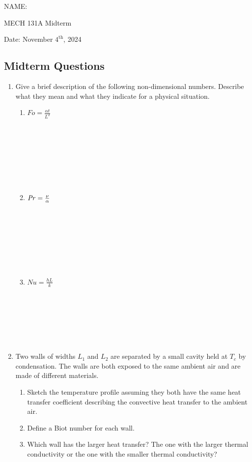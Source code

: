 \documentclass[12pt,letterpaper]{article}
\begin{document}
\noindent
NAME:

\noindent
MECH 131A Midterm

\noindent
Date: November $4^{\mathrm{th}}$, 2024

\subsection*{Midterm Questions}

\begin{enumerate}

    \item Give a brief description of the following non-dimensional numbers.
        Describe what they mean and what they indicate for a physical situation.

    \begin{enumerate}
        \item $\mathit{Fo} = \frac{\alpha t}{L^2}$ \\ \\ \\ \\ \\ \\ \\ \\
        \item $\mathit{Pr} = \frac{\nu}{\alpha}$ \\ \\ \\ \\ \\ \\ \\ \\
        \item $\mathit{Nu} = \frac{h L}{k}$ \\ \\ \\ \\ \\ \\ \\
    \end{enumerate}
    \newpage

    \item Two walls of widths $L_1$ and $L_2$ are separated by a small cavity held at $T_c$ by condensation.
        The walls are both exposed to the same ambient air and are made of different materials.
        \begin{enumerate}
            \item Sketch the temperature profile assuming they both have the same heat transfer coefficient describing the convective heat transfer to the ambient air.
            \item Define a Biot number for each wall.
            \item Which wall has the larger heat transfer?
                The one with the larger thermal conductivity or the one with the smaller thermal conductivity?
        \end{enumerate}
    \newpage


\end{enumerate}
\end{document}
